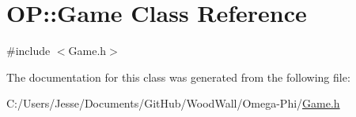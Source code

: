 \hypertarget{class_o_p_1_1_game}{}\section{OP\+::Game Class Reference}
\label{class_o_p_1_1_game}


{\ttfamily \#include $<$Game.\+h$>$}



The documentation for this class was generated from the following file\+:\begin{DoxyCompactItemize}
\item 
C\+:/\+Users/\+Jesse/\+Documents/\+Git\+Hub/\+Wood\+Wall/\+Omega-\/\+Phi/\mbox{\hyperlink{_game_8h}{Game.\+h}}\end{DoxyCompactItemize}
